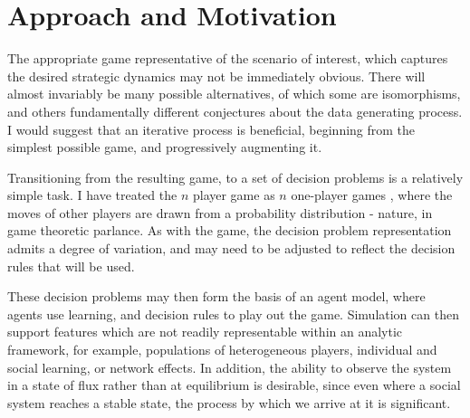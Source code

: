 \section{Approach and Motivation}
\label{sec:model_design}

The appropriate game representative of the scenario of interest, which captures the desired strategic dynamics may not be immediately obvious. There will almost invariably be many possible alternatives, of which some are isomorphisms, and others fundamentally different conjectures about the data generating process. I would suggest that an iterative process is beneficial, beginning from the simplest possible game, and progressively augmenting it.

Transitioning from the resulting game, to a set of decision problems is a relatively simple task. I have treated the $n$ player game as $n$ one-player games \citep{RiosInsua2009}, where the moves of other players are drawn from a probability distribution - nature, in game theoretic parlance. As with the game, the decision problem representation admits a degree of variation, and may need to be adjusted to reflect the decision rules that will be used.

These decision problems may then form the basis of an agent model, where agents use learning, and decision rules to play out the game. Simulation can then support features which are not readily representable within an analytic framework, for example, populations of heterogeneous players, individual and social learning, or network effects. In addition, the ability to observe the system in a state of flux rather than at equilibrium is desirable, since even where a social system reaches a stable state, the process by which we arrive at it is significant. 